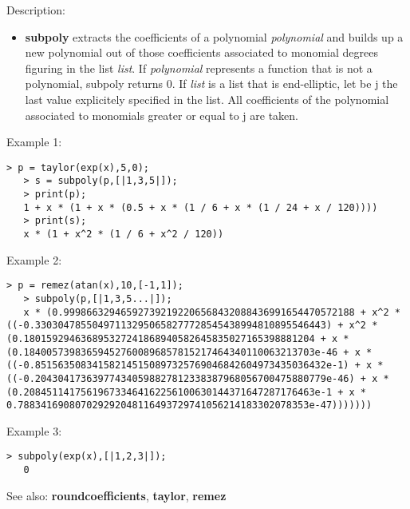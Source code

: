 \noindent Description: \begin{itemize}

\item \textbf{subpoly} extracts the coefficients of a polynomial \emph{polynomial} and builds up a
   new polynomial out of those coefficients associated to monomial degrees figuring in
   the list \emph{list}. 
   If \emph{polynomial} represents a function that is not a polynomial, subpoly returns 0.
   If \emph{list} is a list that is end-elliptic, let be j the last value explicitely specified
   in the list. All coefficients of the polynomial associated to monomials greater or
   equal to j are taken.
\end{itemize}
\noindent Example 1: 
\begin{center}\begin{minipage}{14.8cm}\begin{Verbatim}[frame=single]
   > p = taylor(exp(x),5,0);
   > s = subpoly(p,[|1,3,5|]);
   > print(p);
   1 + x * (1 + x * (0.5 + x * (1 / 6 + x * (1 / 24 + x / 120))))
   > print(s);
   x * (1 + x^2 * (1 / 6 + x^2 / 120))
\end{Verbatim}
\end{minipage}\end{center}
\noindent Example 2: 
\begin{center}\begin{minipage}{14.8cm}\begin{Verbatim}[frame=single]
   > p = remez(atan(x),10,[-1,1]);
   > subpoly(p,[|1,3,5...|]);
   x * (0.999866329465927392192206568432088436991654470572188 + x^2 * ((-0.330304785504971132950658277728545438994810895546443) + x^2 * (0.180159294636895327241868940582645835027165398881204 + x * (0.184005739836594527600896857815217464340110063213703e-46 + x * ((-0.851563508341582145150897325769046842604973435036432e-1) + x * ((-0.204304173639774340598827812338387968056700475880779e-46) + x * (0.208451141756196733464162256100630144371647287176463e-1 + x * 0.788341690807029292048116493729741056214183302078353e-47)))))))
\end{Verbatim}
\end{minipage}\end{center}
\noindent Example 3: 
\begin{center}\begin{minipage}{14.8cm}\begin{Verbatim}[frame=single]
   > subpoly(exp(x),[|1,2,3|]);
   0
\end{Verbatim}
\end{minipage}\end{center}
See also: \textbf{roundcoefficients}, \textbf{taylor}, \textbf{remez}
